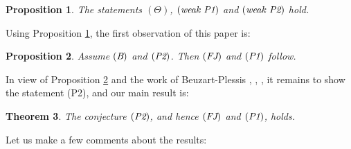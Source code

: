 \documentclass[11pt]{amsart}
\numberwithin{equation}{section}
\theoremstyle{plain}
\newtheorem{thm}{Theorem}[section]
\newtheorem{prop}[thm]{Proposition}
\theoremstyle{definition}
\theoremstyle{remark}
\begin{document}
\begin{prop} \label{P:1.1}
The statements $(\Theta)$, $(\emph{weak P1})$ and $(\emph{weak P2})$ hold.
\end{prop}

Using Proposition \ref{P:1.1}, the first observation of this paper is:

\begin{prop} \label{P:1.2}
Assume $(\emph{B})$ and $(\emph{P2})$. Then $(\emph{FJ})$ and $(\emph{P1})$ follow. 
\end{prop}

In view of Proposition \ref{P:1.2} and the work of Beuzart-Plessis \cite{bp1}, \cite{bp2}, \cite{bp3}, it remains to show the statement (P2), and our main result is:

\begin{thm}
\label{t:main}
The conjecture $(\emph{P2})$, and hence $(\emph{FJ})$ and $(\emph{P1})$, holds.
\end{thm}

Let us make a few comments about the results:
\end{document}
